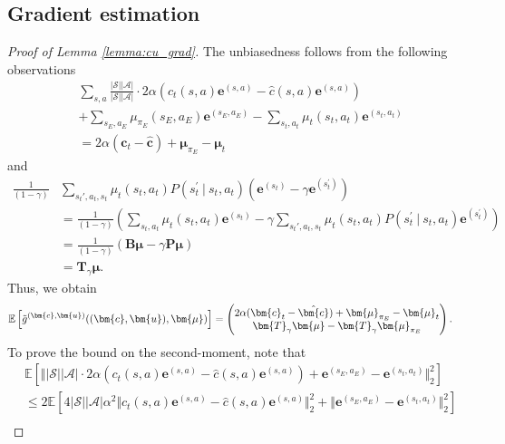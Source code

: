 \documentclass[10pt]{article} %
\def\Ac{\ensuremath{\mathcal{A}}}
\def\mB{{\bm{B}}}
\def\mP{{\bm{P}}}
\def\mTg{{\bm{T}}_\gamma}
\def\vc{{\bm{c}}}
\def\ve{{\bm{e}}}
\def\vu{{\bm{u}}}
\def\vmu{{\bm{\mu}}}
\def\evc{{c}}
\def\evmu{{\mu}}
\newcommand{\E}{\mathbb{E}}
\newcommand{\St}{\mathcal{S}}
\begin{document}
\subsection{Gradient estimation}
\begin{proof}[Proof of Lemma \ref{lemma:cu_grad}]
        The unbiasedness follows from the following observations
        \begin{align*}
            &\sum\limits_{s,a}\frac{|\St||\Ac|}{|\St||\Ac|}\cdot 2\alpha\left(\evc_t(s,a)\ve^{(s,a)}-\hat{\evc}(s,a)\ve^{(s,a)}\right)\\
            &+\sum\limits_{s_E,a_E} \evmu_{\pi_E}(s_E,a_E)\ve^{(s_E,a_E)} - \sum\limits_{s_t,a_t}\evmu_t(s_t,a_t)\ve^{(s_t,a_t)}\\
            &= 2\alpha(\vc_t - \hat{\vc}) + \vmu_{\pi_E} - \vmu_t
        \end{align*}
        and
        \begin{align*}
            \frac{1}{(1-\gamma)} &\sum\limits_{s_t',a_t,s_t} \evmu_t(s_t,a_t)P(s^\prime_t\:|\:s_t,a_t)(\ve^{(s_t)} - \gamma \ve^{(s_t^\prime)})\\
            &= \frac{1}{(1-\gamma)}\left(\sum\limits_{s_t,a_t}\evmu_t(s_t,a_t)\ve^{(s_t)} -\gamma \sum\limits_{s_t',a_t,s_t} \evmu_t(s_t,a_t)P(s^\prime_t\:|\:s_t,a_t) \ve^{(s_t^\prime)} \right)\\
            &= \frac{1}{(1-\gamma)}(\mB\vmu - \gamma\mP\vmu)\\
            &= \mTg\vmu.
        \end{align*}
        Thus, we obtain
        \begin{align*}
        \E\left[ \Tilde{g}^{(\vc,\vu)}((\vc,\vu),\vmu) \right] &=                                                 \begin{pmatrix}
                    2\alpha(\vc_t-\hat{\vc}) + \vmu_{\pi_E} - \vmu_t \\
                    \mTg\vmu - \mTg\vmu_{\pi_E}
                    \end{pmatrix}.
        \end{align*}
        To prove the bound on the second-moment, note that
        \begin{align*}
            &\E\left[\Big\Vert |\St||\Ac|\cdot 2\alpha\left(\evc_t(s,a)\ve^{(s,a)}-\hat{\evc}(s,a)\ve^{(s,a)}\right) + \ve^{(s_E,a_E)} - \ve^{(s_t,a_t)}\Big\Vert_2^2\right] \\
            &\leq 2\E\left[4|\St||\Ac|\alpha^2\Big\Vert\evc_t(s,a)\ve^{(s,a)}-\hat{\evc}(s,a)\ve^{(s,a)} \Big\Vert_2^2 + \Big\Vert \ve^{(s_E,a_E)} - \ve^{(s_t,a_t)}\Big\Vert_2^2\right]\\

\end{align*}
\end{proof}
\end{document}
